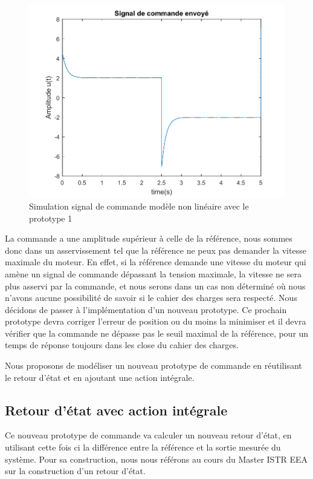 \begin{figure}[!ht]
\centering
\includegraphics[width = .8\textwidth]{./IV/images/comNLproto1.pdf}
\caption{Simulation signal de commande modèle non linéaire avec le prototype 1\label{fig:comNL_proto1}}
\end{figure}  
La commande a une amplitude supérieur à celle de la référence, nous sommes donc dans un asservissement tel que la référence ne peux pas demander la vitesse maximale du moteur. En effet, si la référence demande une vitesse du moteur qui amène un signal de commande dépassant la tension maximale, la vitesse ne sera plus asservi par la commande, et nous serons dans un cas non déterminé où nous n'avons aucune possibilité de savoir si le cahier des charges sera respecté.
Nous décidons de passer à l'implémentation d'un nouveau prototype. Ce prochain prototype devra corriger l'erreur de position ou du moins la minimiser et il devra vérifier que la commande ne dépasse pas le seuil maximal de la référence, pour un temps de réponse toujours dans les close du cahier des charges.

\begin{center}
Nous proposons de modéliser un nouveau prototype de commande en réutilisant le retour d'état et en ajoutant une action intégrale.
\end{center}
\subsection{Retour d'état avec action intégrale}
		Ce nouveau prototype de commande va calculer un nouveau retour d'état, en utilisant cette fois ci la différence entre la référence et la sortie mesurée du système. Pour sa construction, nous nous référons au cours du Master ISTR EEA sur la construction d'un retour d'état. 

